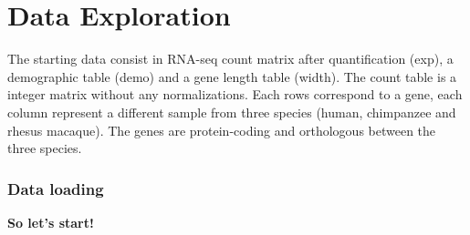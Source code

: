 \documentclass[]{book}
\begin{document}
\hypertarget{DataExploration}{%
\chapter{Data Exploration}\label{DataExploration}}

The starting data consist in RNA-seq count matrix after quantification (exp), a demographic table (demo) and a gene length table (width). The count table is a integer matrix without any normalizations. Each rows correspond to a gene, each column represent a different sample from three species (human, chimpanzee and rhesus macaque). The genes are protein-coding and orthologous between the three species.

\hypertarget{data-loading}{%
\subsection{Data loading}\label{data-loading}}

\textbf{So let's start!}
\end{document}
